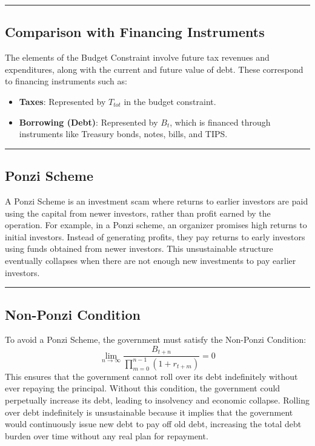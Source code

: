 \documentclass{article}
\begin{document}
\noindent\rule{\linewidth}{0.5pt}

\subsection{Comparison with Financing Instruments}
The elements of the Budget Constraint involve future tax revenues and expenditures, along with the current and future value of debt. These correspond to financing instruments such as:
\begin{itemize}
    \item \textbf{Taxes}: Represented by \(T_{tot}\) in the budget constraint.
    \item \textbf{Borrowing (Debt)}: Represented by \(B_t\), which is financed through instruments like Treasury bonds, notes, bills, and TIPS\@.
\end{itemize}

\noindent\rule{\linewidth}{0.5pt}

\subsection{Ponzi Scheme}
A Ponzi Scheme is an investment scam where returns to earlier investors are paid using the capital from newer investors, rather than profit earned by the operation. For example, in a Ponzi scheme, an organizer promises high returns to initial investors. Instead of generating profits, they pay returns to early investors using funds obtained from newer investors. This unsustainable structure eventually collapses when there are not enough new investments to pay earlier investors.

\noindent\rule{\linewidth}{0.5pt}

\subsection{Non-Ponzi Condition}
To avoid a Ponzi Scheme, the government must satisfy the Non-Ponzi Condition:
\[
\lim_{n \to \infty} \frac{B_{t+n}}{\prod_{m=0}^{n-1} (1 + r_{t+m})} = 0
\]
This ensures that the government cannot roll over its debt indefinitely without ever repaying the principal. Without this condition, the government could perpetually increase its debt, leading to insolvency and economic collapse. Rolling over debt indefinitely is unsustainable because it implies that the government would continuously issue new debt to pay off old debt, increasing the total debt burden over time without any real plan for repayment.
\end{document}
